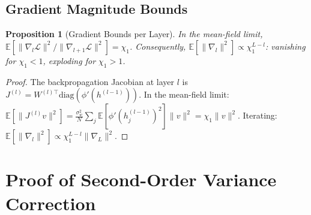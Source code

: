 \documentclass[10pt]{article}
\newcommand{\EE}{\mathbb{E}}
\newtheorem{proposition}[theorem]{Proposition}
\begin{document}
\subsection{Gradient Magnitude Bounds}

\begin{proposition}[Gradient Bounds per Layer]
\label{prop:gradient-bounds}
In the mean-field limit, $\EE[\|\nabla_l \mathcal{L}\|^2/\|\nabla_{l+1} \mathcal{L}\|^2] = \chi_1$.
Consequently, $\EE[\|\nabla_l\|^2] \propto \chi_1^{L-l}$: vanishing for $\chi_1 < 1$, exploding for $\chi_1 > 1$.
\end{proposition}

\begin{proof}
The backpropagation Jacobian at layer $l$ is $J^{(l)} = W^{(l)\top} \text{diag}(\phi'(h^{(l-1)}))$.
In the mean-field limit:
$\EE[\|J^{(l)} v\|^2] = \frac{\sigma_w^2}{N} \sum_j \EE[\phi'(h_j^{(l-1)})^2] \|v\|^2 = \chi_1 \|v\|^2$.
Iterating: $\EE[\|\nabla_l\|^2] \propto \chi_1^{L-l} \|\nabla_L\|^2$.
\end{proof}
\section{Proof of Second-Order Variance Correction}
\label{app:second-order-proof}
\end{document}
